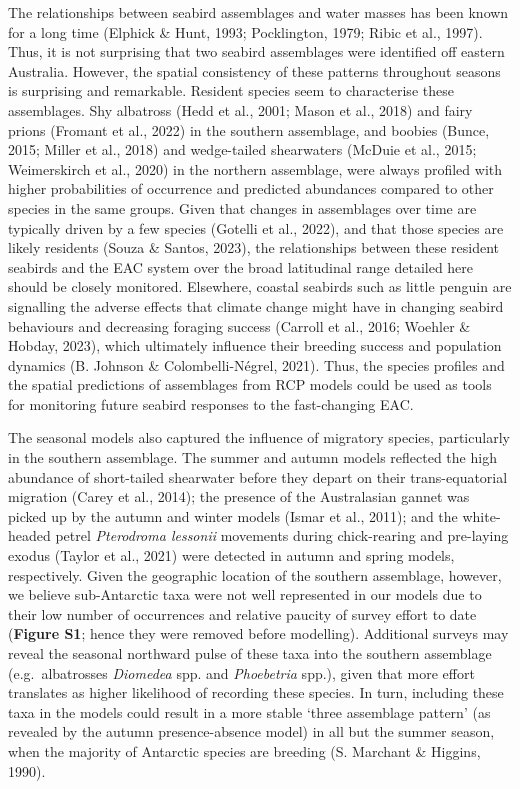 \documentclass{article}
\begin{document}
\begin{linenumbers}
The relationships between seabird assemblages and water masses has been known for a long time (Elphick \& Hunt, 1993; Pocklington, 1979; Ribic et al., 1997). Thus, it is not surprising that two seabird assemblages were identified off eastern Australia. However, the spatial consistency of these patterns throughout seasons is surprising and remarkable. Resident species seem to characterise these assemblages. Shy albatross (Hedd et al., 2001; Mason et al., 2018) and fairy prions (Fromant et al., 2022) in the southern assemblage, and boobies (Bunce, 2015; Miller et al., 2018) and wedge-tailed shearwaters (McDuie et al., 2015; Weimerskirch et al., 2020) in the northern assemblage, were always profiled with higher probabilities of occurrence and predicted abundances compared to other species in the same groups. Given that changes in assemblages over time are typically driven by a few species (Gotelli et al., 2022), and that those species are likely residents (Souza \& Santos, 2023), the relationships between these resident seabirds and the EAC system over the broad latitudinal range detailed here should be closely monitored. Elsewhere, coastal seabirds such as little penguin are signalling the adverse effects that climate change might have in changing seabird behaviours and decreasing foraging success (Carroll et al., 2016; Woehler \& Hobday, 2023), which ultimately influence their breeding success and population dynamics (B. Johnson \& Colombelli-Négrel, 2021). Thus, the species profiles and the spatial predictions of assemblages from RCP models could be used as tools for monitoring future seabird responses to the fast-changing EAC.

The seasonal models also captured the influence of migratory species, particularly in the southern assemblage. The summer and autumn models reflected the high abundance of short-tailed shearwater before they depart on their trans-equatorial migration (Carey et al., 2014); the presence of the Australasian gannet was picked up by the autumn and winter models (Ismar et al., 2011); and the white-headed petrel \emph{Pterodroma lessonii} movements during chick-rearing and pre-laying exodus (Taylor et al., 2021) were detected in autumn and spring models, respectively. Given the geographic location of the southern assemblage, however, we believe sub-Antarctic taxa were not well represented in our models due to their low number of occurrences and relative paucity of survey effort to date (\textbf{Figure S1}; hence they were removed before modelling). Additional surveys may reveal the seasonal northward pulse of these taxa into the southern assemblage (e.g.~albatrosses \emph{Diomedea} spp. and \emph{Phoebetria} spp.), given that more effort translates as higher likelihood of recording these species. In turn, including these taxa in the models could result in a more stable `three assemblage pattern' (as revealed by the autumn presence-absence model) in all but the summer season, when the majority of Antarctic species are breeding (S. Marchant \& Higgins, 1990).


\end{linenumbers}
\end{document}
